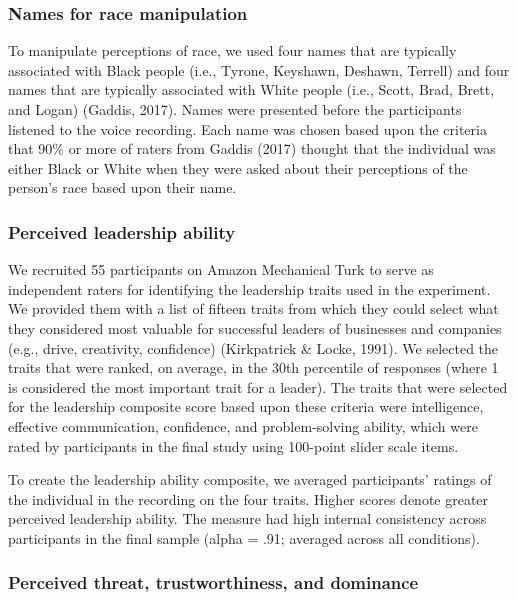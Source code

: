 \documentclass[
  english,
  man]{apa6}
\begin{document}
\hypertarget{names-for-race-manipulation}{%
\subsubsection{Names for race manipulation}\label{names-for-race-manipulation}}

To manipulate perceptions of race, we used four names that are typically associated with Black people (i.e., Tyrone, Keyshawn, Deshawn, Terrell) and four names that are typically associated with White people (i.e., Scott, Brad, Brett, and Logan) (Gaddis, 2017). Names were presented before the participants listened to the voice recording. Each name was chosen based upon the criteria that 90\% or more of raters from Gaddis (2017) thought that the individual was either Black or White when they were asked about their perceptions of the person's race based upon their name.

\hypertarget{perceived-leadership-ability}{%
\subsubsection{Perceived leadership ability}\label{perceived-leadership-ability}}

We recruited 55 participants on Amazon Mechanical Turk to serve as independent raters for identifying the leadership traits used in the experiment. We provided them with a list of fifteen traits from which they could select what they considered most valuable for successful leaders of businesses and companies (e.g., drive, creativity, confidence) (Kirkpatrick \& Locke, 1991). We selected the traits that were ranked, on average, in the 30th percentile of responses (where 1 is considered the most important trait for a leader). The traits that were selected for the leadership composite score based upon these criteria were intelligence, effective communication, confidence, and problem-solving ability, which were rated by participants in the final study using 100-point slider scale items.

To create the leadership ability composite, we averaged participants' ratings of the individual in the recording on the four traits. Higher scores denote greater perceived leadership ability. The measure had high internal consistency across participants in the final sample (alpha = .91; averaged across all conditions).

\hypertarget{perceived-threat-trustworthiness-and-dominance}{%
\subsubsection{Perceived threat, trustworthiness, and dominance}\label{perceived-threat-trustworthiness-and-dominance}}
\end{document}
